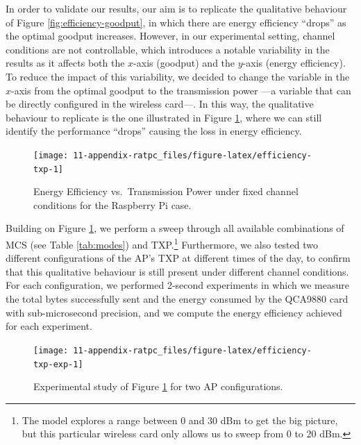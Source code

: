 \documentclass[twoside,nohyper]{tufte-book}
\theoremstyle{definition}
\theoremstyle{definition}
\theoremstyle{definition}
\theoremstyle{remark}
\begin{document}
In order to validate our results, our aim is to replicate the
qualitative behaviour of Figure \ref{fig:efficiency-goodput}, in which
there are energy efficiency ``drops'' as the optimal goodput increases.
However, in our experimental setting, channel conditions are not
controllable, which introduces a notable variability in the results as
it affects both the \(x\)-axis (goodput) and the \(y\)-axis (energy
efficiency). To reduce the impact of this variability, we decided to
change the variable in the \(x\)-axis from the optimal goodput to the
transmission power ---a variable that can be directly configured in the
wireless card---. In this way, the qualitative behaviour to replicate is
the one illustrated in Figure \ref{fig:efficiency-txp}, where we can
still identify the performance ``drops'' causing the loss in energy
efficiency.




\begin{figure}

{\centering \texttt{[image: 11-appendix-ratpc\_files/figure-latex/efficiency-txp-1]} 

}

\caption[Energy Efficiency vs.~Transmission Power under
fixed channel conditions for the Raspberry Pi case.]{Energy Efficiency vs.~Transmission Power under
fixed channel conditions for the Raspberry Pi case.}\label{fig:efficiency-txp}
\end{figure}

Building on Figure \ref{fig:efficiency-txp}, we perform a sweep through
all available combinations of MCS (see Table \ref{tab:modes}) and
TXP.\footnote{The model explores a range between 0 and 30 dBm to get the
  big picture, but this particular wireless card only allows us to sweep
  from 0 to 20 dBm.} Furthermore, we also tested two different
configurations of the AP's TXP at different times of the day, to confirm
that this qualitative behaviour is still present under different channel
conditions. For each configuration, we performed 2-second experiments in
which we measure the total bytes successfully sent and the energy
consumed by the QCA9880 card with sub-microsecond precision, and we
compute the energy efficiency achieved for each experiment.




\begin{figure}

{\centering \texttt{[image: 11-appendix-ratpc\_files/figure-latex/efficiency-txp-exp-1]} 

}

\caption[Experimental study of Figure
\ref{fig:efficiency-txp} for two AP configurations.]{Experimental study of Figure
\ref{fig:efficiency-txp} for two AP configurations.}\label{fig:efficiency-txp-exp}
\end{figure}
\end{document}
